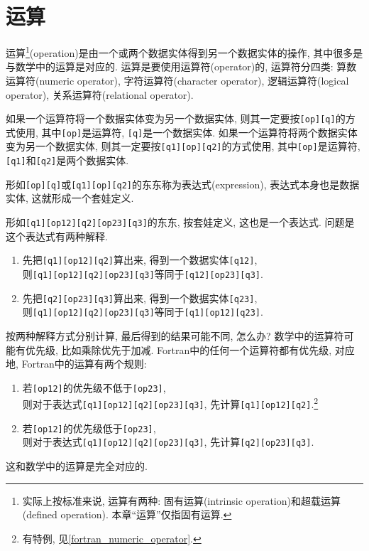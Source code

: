 \section{运算}\label{fortran_opration}

运算\footnote{
    实际上按标准来说, 运算有两种: 固有运算(intrinsic operation)和超载运算(defined operation). 本章``运算''仅指固有运算.
}(operation)是由一个或两个数据实体得到另一个数据实体的操作, 其中很多是与数学中的运算是对应的. 运算是要使用运算符(operator)的, 运算符分四类: 算数运算符(numeric operator), 字符运算符(character operator), 逻辑运算符(logical operator), 关系运算符(relational operator).

如果一个运算符将一个数据实体变为另一个数据实体, 则其一定要按\texttt{[op][q]}的方式使用, 其中\texttt{[op]}是运算符, \texttt{[q]}是一个数据实体. 如果一个运算符将两个数据实体变为另一个数据实体, 则其一定要按\texttt{[q1][op][q2]}的方式使用, 其中\texttt{[op]}是运算符, \texttt{[q1]}和\texttt{[q2]}是两个数据实体. 

形如\texttt{[op][q]}或\texttt{[q1][op][q2]}的东东称为表达式(expression), 表达式本身也是数据实体, 这就形成一个套娃定义.

形如\texttt{[q1][op12][q2][op23][q3]}的东东, 按套娃定义, 这也是一个表达式. 问题是这个表达式有两种解释.
\begin{enumerate}
    \item 先把\texttt{[q1][op12][q2]}算出来, 得到一个数据实体\texttt{[q12]},\\则\texttt{[q1][op12][q2][op23][q3]}等同于\texttt{[q12][op23][q3]}.
    \item 先把\texttt{[q2][op23][q3]}算出来, 得到一个数据实体\texttt{[q23]},\\则\texttt{[q1][op12][q2][op23][q3]}等同于\texttt{[q1][op12][q23]}.
\end{enumerate}
按两种解释方式分别计算, 最后得到的结果可能不同, 怎么办? 数学中的运算符可能有优先级, 比如乘除优先于加减. Fortran中的任何一个运算符都有优先级, 对应地, Fortran中的运算有两个规则:
\begin{enumerate}
    \item 若\texttt{[op12]}的优先级不低于\texttt{[op23]},\\则对于表达式\texttt{[q1][op12][q2][op23][q3]}, 先计算\texttt{[q1][op12][q2]}.\footnote{
        有特例, 见\ref{fortran_numeric_operator}.
    }
    \item 若\texttt{[op12]}的优先级低于\texttt{[op23]},\\则对于表达式\texttt{[q1][op12][q2][op23][q3]}, 先计算\texttt{[q2][op23][q3]}.
\end{enumerate}
这和数学中的运算是完全对应的.

